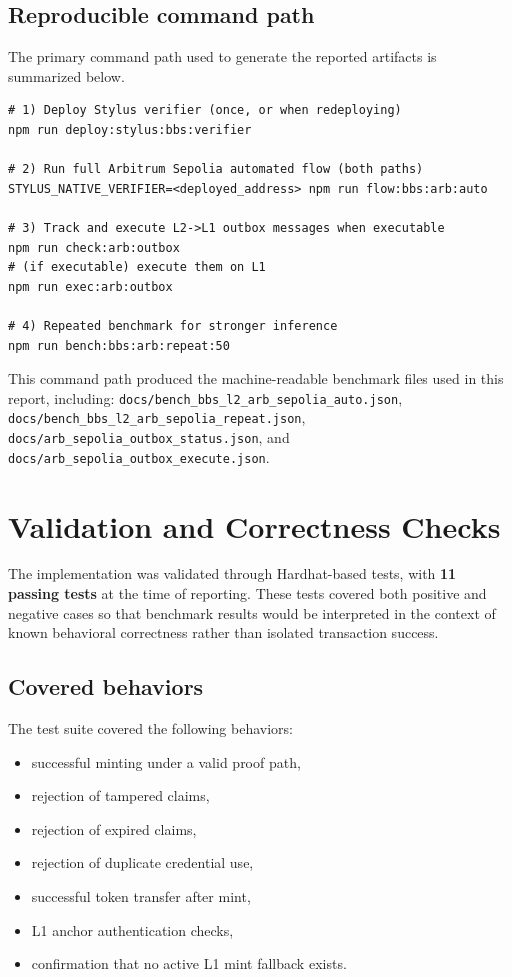\documentclass[11pt]{article}
\begin{document}
\subsection{Reproducible command path}
The primary command path used to generate the reported artifacts is summarized below.

\begin{verbatim}
# 1) Deploy Stylus verifier (once, or when redeploying)
npm run deploy:stylus:bbs:verifier

# 2) Run full Arbitrum Sepolia automated flow (both paths)
STYLUS_NATIVE_VERIFIER=<deployed_address> npm run flow:bbs:arb:auto

# 3) Track and execute L2->L1 outbox messages when executable
npm run check:arb:outbox
# (if executable) execute them on L1
npm run exec:arb:outbox

# 4) Repeated benchmark for stronger inference
npm run bench:bbs:arb:repeat:50
\end{verbatim}

This command path produced the machine-readable benchmark files used in this report, including:
\texttt{docs/bench\_bbs\_l2\_arb\_sepolia\_auto.json},
\texttt{docs/bench\_bbs\_l2\_arb\_sepolia\_repeat.json},
\texttt{docs/arb\_sepolia\_outbox\_status.json},
and \texttt{docs/arb\_sepolia\_outbox\_execute.json}.

\section{Validation and Correctness Checks}

The implementation was validated through Hardhat-based tests, with \textbf{11 passing tests} at the time of reporting. These tests covered both positive and negative cases so that benchmark results would be interpreted in the context of known behavioral correctness rather than isolated transaction success.

\subsection{Covered behaviors}
The test suite covered the following behaviors:

\begin{itemize}
  \item successful minting under a valid proof path,
  \item rejection of tampered claims,
  \item rejection of expired claims,
  \item rejection of duplicate credential use,
  \item successful token transfer after mint,
  \item L1 anchor authentication checks,
  \item confirmation that no active L1 mint fallback exists.
\end{itemize}
\end{document}
